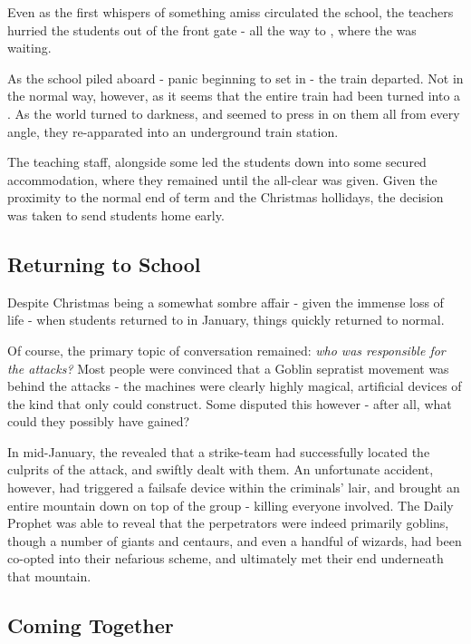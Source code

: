\documentclass[oneside, 9pt,english]{extbook}
\begin{document}
	Even as the first whispers of something amiss circulated the school, the teachers hurried the students out of the front gate - all the way to , where the  was waiting. 
	
	As the school piled aboard - panic beginning to set in - the train departed. Not in the normal way, however, as it seems that the entire train had been turned into a . As the world turned to darkness, and seemed to press in on them all from every angle, they re-apparated into an underground train station. 
	
	The teaching staff, alongside some  led the students down into some secured accommodation, where they remained until the all-clear was given. Given the proximity to the normal end of term and the Christmas hollidays, the decision was taken to send students home early. 
	


	\subsection{Returning to School}

		Despite Christmas being a somewhat sombre affair - given the immense loss of life - when students returned to  in January, things quickly returned to normal. 
		
		Of course, the primary topic of conversation remained: {\it who was responsible for the attacks?} Most people were convinced that a Goblin sepratist movement was behind the attacks - the machines were clearly highly magical, artificial devices of the kind that only  could construct. Some disputed this however - after all, what could they possibly have gained?
		
		In mid-January, the  revealed that a strike-team had successfully located the culprits of the attack, and swiftly dealt with them. An unfortunate accident, however, had triggered a failsafe device within the criminals' lair, and brought an entire mountain down on top of the group - killing everyone involved. The Daily Prophet was able to reveal that the perpetrators were indeed primarily goblins, though a number of giants and centaurs, and even a handful of wizards, had been co-opted into their nefarious scheme, and ultimately met their end underneath that mountain.
	
	\subsection{Coming Together}
	
\end{document}
